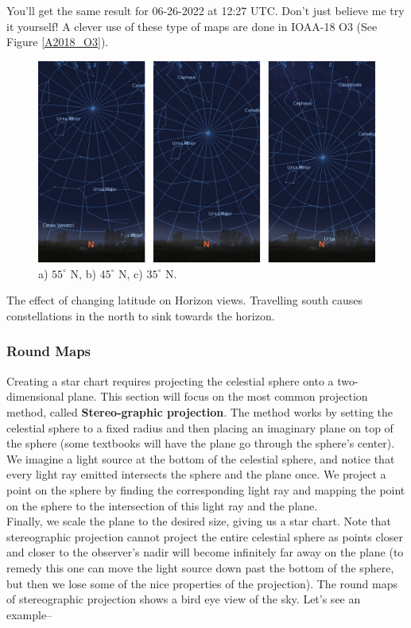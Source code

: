 \documentclass[a4paper,12pt]{extarticle}
\begin{document}
You'll get the same result for 06-26-2022 at 12:27 UTC. Don't just believe me try it yourself! A clever use of these type of maps are done in IOAA-18 O3 (See Figure \ref{A2018_O3}). 

\begin{figure}[H]
	\centering
	\includegraphics[width=0.9\linewidth]{skyhorizon.png}
	\caption{a) $55^\circ$ N, b) $45^\circ$ N, c) $35^\circ$ N.}
\end{figure}
The effect of changing latitude on Horizon views. Travelling south causes constellations in the north to sink towards the horizon.

\subsubsection{Round Maps}
Creating a star chart requires projecting the celestial sphere onto a two-dimensional plane. This section will focus on the most common projection method, called \textbf{Stereo-graphic projection}. The method works by setting the celestial sphere to a fixed radius and then placing an imaginary plane on top of the sphere (some textbooks will have the plane go through the sphere's center). We imagine a light source at the bottom of the celestial sphere, and notice that every light ray emitted intersects the sphere and the plane once. We project a point on the sphere by finding the corresponding light ray and mapping the point on the sphere to the intersection of this light ray and the plane.\\ 

Finally, we scale the plane to the desired size, giving us a star chart. Note that stereographic projection cannot project the entire
celestial sphere as points closer and closer to the observer's nadir will become infinitely far away on the plane (to remedy this one can move the light source down past the bottom of the sphere, but then we lose some of the nice properties of the projection). The round maps of stereographic projection shows a bird eye view of the sky. Let's see an example--
\end{document}
